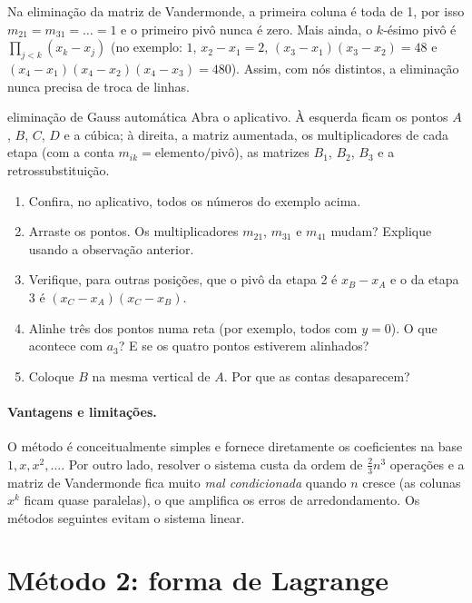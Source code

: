 \begin{observacao}
Na eliminação da matriz de Vandermonde, a primeira coluna é toda de 1, por isso
$m_{21}=m_{31}=\dots=1$ e o primeiro pivô nunca é zero. Mais ainda, o $k$-ésimo pivô
é $\prod_{j<k}(x_k-x_j)$ (no exemplo: $1$, $x_2-x_1=2$, $(x_3-x_1)(x_3-x_2)=48$ e
$(x_4-x_1)(x_4-x_2)(x_4-x_3)=480$). Assim, com nós distintos, a eliminação nunca precisa
de troca de linhas.
\end{observacao}

\begin{atividade}{eliminação de Gauss automática}{\arqGauss}
Abra o aplicativo. À esquerda ficam os pontos $A$, $B$, $C$, $D$ e a cúbica; à direita, a
matriz aumentada, os multiplicadores de cada etapa (com a conta
$m_{ik}=\text{elemento}/\text{pivô}$), as matrizes $B_1$, $B_2$, $B_3$ e a retrossubstituição.
\begin{enumerate}[nosep]
  \item Confira, no aplicativo, todos os números do exemplo acima.
  \item Arraste os pontos. Os multiplicadores $m_{21}$, $m_{31}$ e $m_{41}$ mudam? Explique usando a observação anterior.
  \item Verifique, para outras posições, que o pivô da etapa 2 é $x_B-x_A$ e o da etapa 3 é $(x_C-x_A)(x_C-x_B)$.
  \item Alinhe três dos pontos numa reta (por exemplo, todos com $y=0$). O que acontece com $a_3$? E se os quatro pontos estiverem alinhados?
  \item Coloque $B$ na mesma vertical de $A$. Por que as contas desaparecem?
\end{enumerate}
\end{atividade}

\paragraph{Vantagens e limitações.} O método é conceitualmente simples e fornece
diretamente os coeficientes na base $1,x,x^2,\dots$. Por outro lado, resolver o sistema custa
da ordem de $\tfrac23 n^3$ operações e a matriz de Vandermonde fica muito
\emph{mal condicionada} quando $n$ cresce (as colunas $x^k$ ficam quase paralelas), o que
amplifica os erros de arredondamento. Os métodos seguintes evitam o sistema linear.

\section{Método 2: forma de Lagrange}

